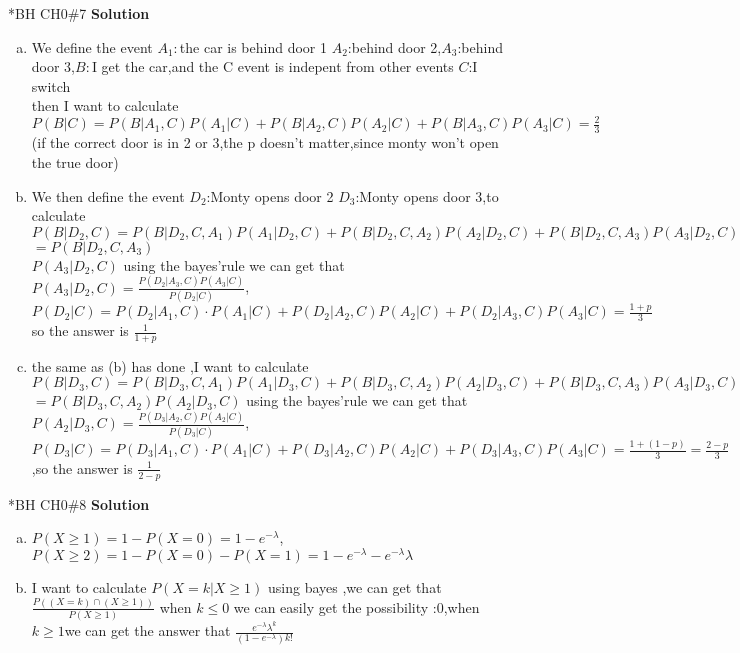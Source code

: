 \documentclass{article}
\newcommand{\solution}{\textbf{\Large Solution}}
\begin{document}
\begin{homeworkProblem}*{BH CH0\#7}
\solution 
	\begin{enumerate}[(a)]
		\item We define the event $A_1:$the car is behind door 1 $A_2$:behind door 2,$A_3$:behind door 3,$B:$I get the car,and the C event is indepent from other events
		$C$:I switch\\
		then I want to calculate $P(B|C)=P(B|A_1,C)P(A_1|C)+P(B|A_2,C)P(A_2|C)+P(B|A_3,C)P(A_3|C)=\frac{2}{3}$(if the correct door is in 2 or 3,the p doesn't matter,since monty won't open the true door) 
		\item We then define the event $D_2$:Monty opens door 2 $D_3$:Monty opens door 3,to calculate $P(B|D_2,C)=P(B|D_2,C,A_1)P(A_1|D_2,C)+P(B|D_2,C,A_2)P(A_2|D_2,C)+P(B|D_2,C,A_3)P(A_3|D_2,C)$
		$=P(B|D_2,C,A_3)$\\$P(A_3|D_2,C)$
		using the bayes'rule we can get that $P(A_3|D_2,C)=\frac{P(D_2|A_3,C)P(A_3|C)}{P(D_2|C)}$,$P(D_2|C)=P(D_2|A_1,C)\cdot P(A_1|C)+P(D_2|A_2,C)P(A_2|C)+P(D_2|A_3,C)P(A_3|C)=\frac{1+p}{3}$
	 so the answer is $\frac{1}{1+p}$
	 \item the same as (b) has done ,I want to calculate $P(B|D_3,C)=P(B|D_3,C,A_1)P(A_1|D_3,C)+P(B|D_3,C,A_2)P(A_2|D_3,C)+P(B|D_3,C,A_3)P(A_3|D_3,C)$
	 $=P(B|D_3,C,A_2)P(A_2|D_3,C)$
	 using the bayes'rule we can get that $P(A_2|D_3,C)=\frac{P(D_3|A_2,C)P(A_2|C)}{P(D_3|C)}$,$P(D_3|C)=P(D_3|A_1,C)\cdot P(A_1|C)+P(D_3|A_2,C)P(A_2|C)+P(D_3|A_3,C)P(A_3|C)=\frac{1+(1-p)}{3}=\frac{2-p}{3}$,so the answer is $\frac{1}{2-p}$
	\end{enumerate}
	\end{homeworkProblem}
\begin{homeworkProblem}*{BH CH0\#8}
\solution \\
\large{
	\begin{enumerate}[(a)]
\item $P(X\geq 1)=1-P(X=0)=1-e^{-\lambda}$,$P(X\geq 2)=1-P(X=0)-P(X=1)=1-e^{-\lambda}-e^{-\lambda}\lambda$
\item I want to calculate $P(X=k|X\geq 1)$ using bayes ,we can get that $\frac{P((X=k)\cap (X\geq 1))}{P(X\geq 1)}$
when $k\leq 0$ we can easily get the possibility :0,when $k\geq 1$we can get the answer that $\frac{e^{-\lambda}\lambda^k}{(1-e^{-\lambda})k!}$
\end{enumerate}}
\end{homeworkProblem}
\end{document}

